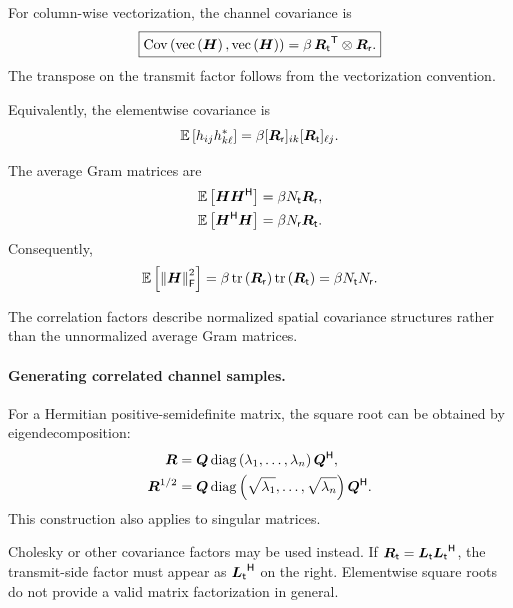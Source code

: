 For column-wise vectorization, the channel covariance is
\begin{equation}\label{eq:vectorcov}
	\boxed{
		\operatorname{Cov}\left(\operatorname{vec}\left(\bm{H}\right),\operatorname{vec}\left(\bm{H}\right)\right)
		=\beta\,
		{\bm{R}_{\mathsf t}}^{\mathsf{T}}\otimes \bm{R}_{\mathsf r}.
	}
\end{equation}
The transpose on the transmit factor follows
from the vectorization convention.

Equivalently, the elementwise covariance is
\begin{equation*}
	\mathbb{E}\left[h_{ij}h_{k\ell}^*\right]
	=\beta
	[\bm{R}_{\mathsf r}]_{ik}
	[\bm{R}_{\mathsf t}]_{\ell j}.
\end{equation*}

The average Gram matrices are
\begin{align}
	\mathbb{E}\left[\bm{H}{\bm{H}}^{\mathsf{H}}\right]
	&=\beta N_{\mathsf{t}}\bm{R}_{\mathsf r},
	\\
	\mathbb{E}\left[{\bm{H}}^{\mathsf{H}}\bm{H}\right]
	&=\beta N_{\mathsf{r}}\bm{R}_{\mathsf t}.
\end{align}
Consequently,
\begin{equation*}
	\mathbb{E}\left[\left\|\bm{H}\right\|_{\mathsf{F}}^2\right]
	=\beta
	\operatorname{tr}\left(\bm{R}_{\mathsf r}\right)
	\operatorname{tr}\left(\bm{R}_{\mathsf t}\right)
	=\beta N_{\mathsf{t}}N_{\mathsf{r}}.
\end{equation*}

The correlation factors describe normalized
spatial covariance structures rather than the
unnormalized average Gram matrices.


\paragraph{Generating correlated channel samples.}

For a Hermitian positive-semidefinite matrix,
the square root can be obtained by
eigendecomposition:
\begin{align*}
	\bm{R}
	&=\bm{Q}
	\operatorname{diag}\left(\lambda_1,\ldots,\lambda_n\right)
	{\bm{Q}}^{\mathsf{H}},\\
	\bm{R}^{1/2}
	&=\bm{Q}
	\operatorname{diag}\left(\sqrt{\lambda_1},\ldots,\sqrt{\lambda_n}\right)
	{\bm{Q}}^{\mathsf{H}}.
\end{align*}
This construction also applies to singular matrices.

Cholesky or other covariance factors may be used
instead. If
$\bm{R}_{\mathsf t}=\bm{L}_{\mathsf t}
{\bm{L}_{\mathsf t}}^{\mathsf{H}}$,
the transmit-side factor must appear as
${\bm{L}_{\mathsf t}}^{\mathsf{H}}$ on the right.
Elementwise square roots do not provide a
valid matrix factorization in general.


